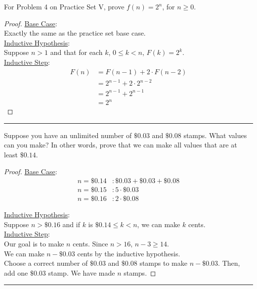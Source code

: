 \documentclass{article}
\def \proofDistance {5pt}
\newcommand{\proofseparator}{\par\noindent\rule{\textwidth}{0.4pt}}
\newcommand{\pf}[1]{
    \vspace{\proofDistance}
    \begin{proof}
    #1
    \end{proof}
    \proofseparator
}
\begin{document}
        \begin{example}
            For Problem 4 on Practice Set V, prove $f(n) = 2^n$, for $n \geq 0$.
        \end{example}

        \pf{
            \item \underline{Base Case}: \\
            Exactly the same as the practice set base case. \\
    
            \noindent \underline{Inductive Hypothesis}: \\
            Suppose $n > 1$ and that for each $k$, $ 0 \leq k < n$, $F(k) = 2^k$. \\
    
            \noindent \underline{Inductive Step}:
            \begin{align*}
                F(n) &= F(n-1) + 2 \cdot F(n-2) \\
                &= 2^{n-1} + 2 \cdot 2^{n-2} \\
                &= 2^{n-1} + 2^{n - 1} \\
                &= 2^n
            \end{align*}
        }
    
        \begin{example}
            Suppose you have an unlimited number of $\$0.03$ and $\$0.08$ stamps. What values can you make? In other words, prove that we can make all values that are at least $\$0.14$. 
        \end{example}

        \pf{
            \item \underline{Base Case}:
            \begin{align*}
                n = \$0.14 &\colon \$0.03 + \$0.03 + \$0.08 \\
                n = \$0.15 &\colon 5 \cdot \$0.03 \\
                n = \$0.16 &\colon 2 \cdot \$0.08
            \end{align*}
        
            \noindent \underline{Inductive Hypothesis}: \\
            Suppose $n > \$0.16$ and if $k$ is $\$0.14 \leq k < n$, we can make $k$ cents. \\
    
            \noindent \underline{Inductive Step}: \\
            Our goal is to make $n$ cents. Since $n> 16$, $n - 3 \geq 14$. \\
            We can make $n - \$0.03$ cents by the inductive hypothesis. \\
            Choose a correct number of $\$0.03$ and $\$0.08$ stamps to make $n - \$0.03$. Then, add one $\$0.03$ stamp. We have made $n$ stamps.
        }
\end{document}
